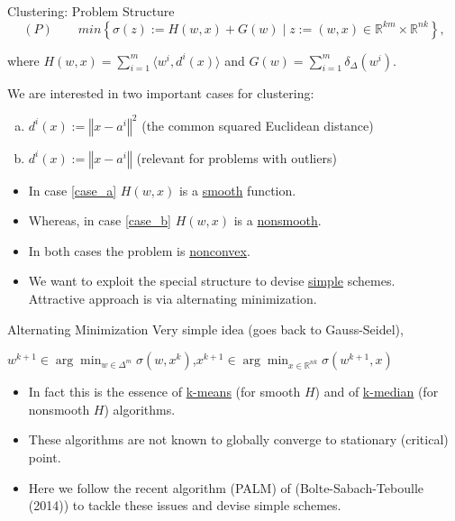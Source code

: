 \documentclass[9pt]{beamer}
\newcommand{\rr}{\mathbb{R}} %
\newcommand{\R}{\mathbb{R}} %
\newcommand{\norm}[1]{\left\Vert {#1} \right\Vert} %
\begin{document}
    \begin{frame}{Clustering: Problem Structure}
    	\begin{equation*}
			(P) \qquad min \left\lbrace \sigma(z) := H(w,x) + G(w) \mid z := (w,x) \in \R^{km} \times \R^{nk} \right\rbrace, 
		\end{equation*}
		\begin{center}
			where $H(w,x) = \sum\limits_{i=1}^{m} \langle w^i , d^i(x) \rangle$ and $G(w) = \sum\limits_{i=1}^{m} \delta_{\Delta}(w^i).$
		\end{center}
		We are interested in two important cases for clustering:
		\begin{enumerate}[(a)]
			\item $d^i(x):= \norm{x-a^i}^2$ (the common squared Euclidean distance)  \label{case_a}
			\item $d^i(x):= \norm{x-a^i}$ (relevant for problems with outliers) \label{case_b}
		\end{enumerate}
		\pause
		\vspace{0.03in}
		\begin{itemize}[<+->]
			\item In case \eqref{case_a} $H(w,x)$ is a \underline{smooth} function.\vspace{0.03in}
			\item Whereas, in case \eqref{case_b} $H(w,x)$ is a \underline{nonsmooth}.\vspace{0.03in}
			\item In both cases the problem is \underline{nonconvex}.\vspace{0.03in}
			\item We want to exploit the special structure to devise \underline{simple} schemes.\\ Attractive approach is via {\dblue alternating minimization}.\\
		\end{itemize}
    \end{frame}
    
    \begin{frame}{Alternating Minimization}
        Very simple idea (goes back to Gauss-Seidel),\\
    	\begin{center}
    		$w^{k+1} \in \arg\!\min_{w \in \Delta^m} \sigma\left(w, x^k\right)$,\quad $x^{k+1} \in \arg\!\min_{x \in \rr^{nk}} \sigma\left( w^{k+1},x\right)$
    	\end{center}
    	\begin{itemize}[<+->]
			\item In fact this is the essence of \underline{k-means} (for smooth $H$) and of \underline{k-median} (for nonsmooth $H$) algorithms.\vspace{0.05in}
			\item These algorithms are not known to globally converge to stationary (critical) point.\vspace{0.05in}
			\item Here we follow the recent algorithm (PALM) of {\dblue (Bolte-Sabach-Teboulle (2014))} to tackle these issues and devise simple schemes.    	
    	\end{itemize}
    \end{frame}
\end{document}
